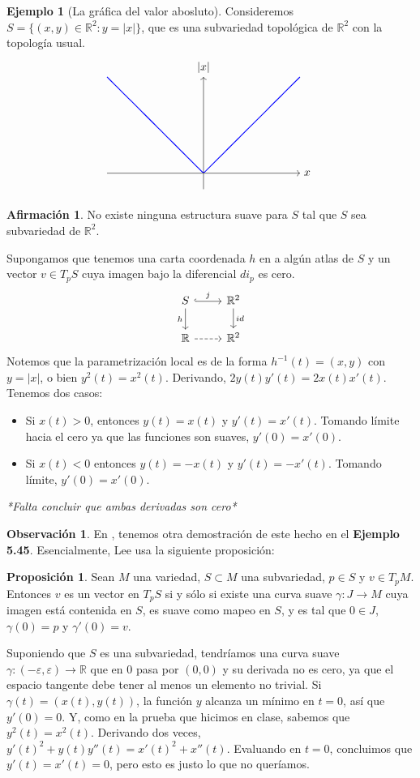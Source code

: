 \documentclass[spanish]{book}
\theoremstyle{definition}
\newtheorem*{prop}{Proposición}
\newtheorem*{obs}{Observación}
\newtheorem*{af}{Afirmación}
\newtheorem*{ejem}{Ejemplo}
\newcommand{\R}{\mathbb{R}}
\begin{document}
\begin{ejem}[La gráfica del valor abosluto]
	Consideremos $S=\{(x,y)\in\R^2:y=|x|\}$, que es una subvariedad topológica de $\R^2$ con la topología usual.
	\[\begin{tikzpicture}
		\draw[->] (-3,0) -- (3,0) node[right] {$x$};
		\draw[->] (0,-.5) -- (0,3) node[above] {$|x|$};
		
		\draw[blue, thick, domain=-3:3, samples=100] plot (\x, {abs(\x)});
	\end{tikzpicture}\]
	\begin{af}
		No existe ninguna estructura suave para $S$ tal que $S$ sea subvariedad de $\R^2$.
	\end{af}
	Supongamos que tenemos una carta coordenada $h$ en a algún atlas de $S$ y un vector $v\in T_pS$ cuya imagen bajo la diferencial $di_p$ es cero.
	\[\begin{tikzcd}
		S\arrow[hook]{r}{j}\arrow[swap]{d}{h}&\R^2\arrow{d}{id}\\
		\R\arrow[dashed]{r}&\R^2
	\end{tikzcd}\]		
	Notemos que la parametrización local es de la forma $h^{-1}(t)=(x,y)$ con $y=|x|$, o bien $y^2(t)=x^2(t)$. Derivando, $2y(t)y'(t)=2x(t)x'(t)$. Tenemos dos casos:
	\begin{itemize}
		\item Si $x(t)>0$, entonces $y(t)=x(t)$ y $y'(t)=x'(t)$. Tomando límite hacia el cero ya que las funciones son suaves, $y'(0)=x'(0)$.
		\item Si $x(t)<0$ entonces $y(t)=-x(t)$ y $y'(t)=-x'(t)$. Tomando límite, $y'(0)=x'(0)$.
	\end{itemize}
	\textit{*Falta concluir que ambas derivadas son cero*}
\end{ejem} 
\begin{obs}
	En \cite{Lee}, tenemos otra demostración de este hecho en el \textbf{Ejemplo 5.45}. Esencialmente, Lee usa la siguiente proposición:
	\begin{prop}
		Sean $M$ una variedad, $S\subset M$ una subvariedad, $p\in S$ y $v\in T_pM$. Entonces $v$ es un vector en $T_pS$ si y sólo si existe una curva suave $\gamma:J\to M$ cuya imagen está contenida en $S$, es suave como mapeo en $S$, y es tal que $0\in J$, $\gamma(0)=p$ y $\gamma'(0)=v$.
	\end{prop}
	Suponiendo que $S$ es una subvariedad, tendríamos una curva suave $\gamma:(-\varepsilon,\varepsilon)\to\R$ que en $0$ pasa por $(0,0)$ y su derivada no es cero, ya que el espacio tangente debe tener al menos un elemento no trivial. Si $\gamma(t)=(x(t),y(t))$, la función $y$ alcanza un mínimo en $t=0$, así que $y'(0)=0$. Y, como en la prueba que hicimos en clase, sabemos que $y^2(t)=x^2(t)$. Derivando dos veces, $y'(t)^2+y(t)y''(t)=x'(t)^2+x''(t)$. Evaluando en $t=0$, concluimos que $y'(t)=x'(t)=0$, pero esto es justo lo que no queríamos.
\end{obs}
\end{document}
